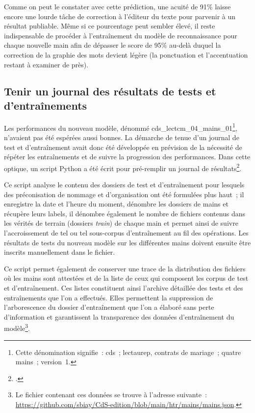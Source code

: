 \documentclass[a4paper,12pt,twoside]{book}
\begin{document}
				Comme on peut le constater avec cette prédiction, une acuité de 91\% laisse encore une lourde tâche de correction à l'éditeur du texte pour parvenir à un résultat publiable. Même si ce pourcentage peut sembler élevé, il reste indispensable de procéder à l'entraînement du modèle de reconnaissance pour chaque nouvelle main afin de dépasser le score de 95\% au-delà duquel la correction de la graphie des mots devient légère (la ponctuation et l'accentuation restant à examiner de près).
			
			\subsection{Tenir un journal des résultats de tests et d'entraînements}
				\label{journal-test}
				Les performances du nouveau modèle, dénommé \textsf{cds\_lectcm\_04\_mains\_01}\footnote{Cette dénomination signifie~: \gls{cds}~; \gls{lectaurep}, contrats de mariage~; quatre mains~; version~1.}, n'avaient pas été espérées aussi bonnes. La démarche de tenue d'un journal de test et d'entraînement avait donc été développée en prévision de la nécessité de répéter les entraînements et de suivre la progression des performances. Dans cette optique, un script Python a été écrit pour pré-remplir un journal de résultats\footcite{biayJournalReconnPy2022}. 
				
				Ce script analyse le contenu des dossiers de test et d'entraînement pour lesquels des préconisation de nommage et d'organisation ont été formulées plus haut~; il enregistre la date et l'heure du moment, dénombre les dossiers de mains et récupère leurs labels, il dénombre également le nombre de fichiers contenus dans les vérités de terrain (dossiers \textit{train}) de chaque main et permet ainsi de suivre l'accroissement de tel ou tel sous-corpus d'entraînement au fil des opérations. Les résultats de tests du nouveau modèle sur les différentes mains doivent ensuite être inscrits manuellement dans le fichier.
				
				Ce script permet également de conserver une trace de la distribution des fichiers où les mains sont attestées et de la liste de ceux qui composent les corpus de test et d'entraînement. Ces listes constituent ainsi l'archive détaillée des tests et des entraînements que l'on a effectués. Elles permettent la suppression de l'arborescence du dossier d'entraînement que l'on a élaboré sans perte d'information et garantissent la transparence des données d'entraînement du modèle\footnote{Le fichier contenant ces données se trouve à l'adresse suivante~: \url{https://github.com/sbiay/CdS-edition/blob/main/htr/mains/mains.json}.}.
				
\end{document}
